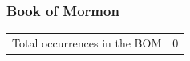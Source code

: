 		
			
				
				
				
		
	\subsubsection{Book of Mormon} %
		\label{HSOP-BOM}
	
		\begin{tabular}{ll}
			Total occurrences in the BOM & 0
		\end{tabular}
		
